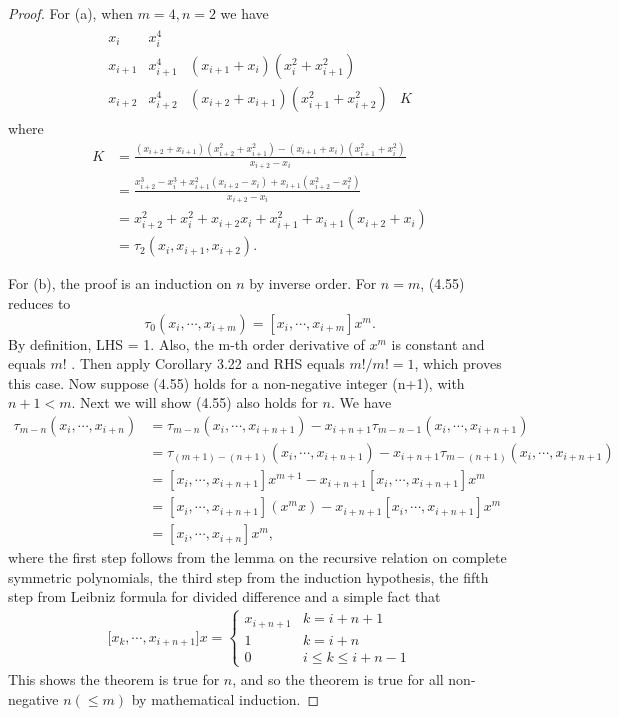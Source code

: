 \documentclass{article}
\newcommand{\RNum}[1]{\uppercase\expandafter{\romannumeral #1\relax}}
\begin{document}
\RNum{8}
\begin{proof}
  For (a), when $m=4,n=2$ we have 
\begin{align*}
  \begin{array}{c|ccc}x_i&x_i^4&&\\x_{i+1}&x_{i+1}^4&(x_{i+1}+x_i)(x_i^2+x_{i+1}^2)&\\x_{i+2}&x_{i+2}^4&(x_{i+2}+x_{i+1})(x_{i+1}^2+x_{i+2}^2)&K\end{array}
\end{align*}
where 
\begin{align*}
  K&=\frac{(x_{i+2}+x_{i+1})(x_{i+2}^2+x_{i+1}^2)-(x_{i+1}+x_{i})(x_{i+1}^2+x_{i}^2)}{x_{i+2}-x_i}\\
  &=\frac{x_{i+2}^3-x_i^3+x_{i+1}^2(x_{i+2}-x_i)+x_{i+1}(x_{i+2}^2-x_i^2)}{x_{i+2}-x_i}\\
  &=x_{i+2}^2+x_i^2+x_{i+2}x_i+x_{i+1}^2+x_{i+1}(x_{i+2}+x_{i})\\
  &=\tau_2(x_i,x_{i+1},x_{i+2}). 
\end{align*}

For (b), the proof is an induction on $n$ by inverse order. 
For $n=m$, (4.55) reduces to 
\[
\tau_0(x_i,\cdots,x_{i+m})=[x_i,\cdots,x_{i+m}]x^m.  
\]
By definition, LHS = 1. Also, the m-th order derivative of 
$x^m$ is constant and equals $m!$ . Then apply Corollary 3.22 and RHS equals $m!/m!=1$, 
which proves this case. Now suppose (4.55) holds for a non-negative integer (n+1), 
with $n+1<m$. Next we will show (4.55) also holds for $n$. We have  
\begin{align*}
  \tau_{m-n}(x_i,\cdots,x_{i+n})&= \tau_{m-n}(x_i,\cdots,x_{i+n+1})-x_{i+n+1}\tau_{m-n-1}(x_i,\cdots,x_{i+n+1})\\
  &=\tau_{(m+1)-(n+1)}(x_i,\cdots,x_{i+n+1})-x_{i+n+1}\tau_{m-(n+1)}(x_i,\cdots,x_{i+n+1})\\
  &=[x_i,\cdots,x_{i+n+1}]x^{m+1}-x_{i+n+1}[x_i,\cdots,x_{i+n+1}]x^{m}\\
  &=[x_i,\cdots,x_{i+n+1}](x^{m}x)-x_{i+n+1}[x_i,\cdots,x_{i+n+1}]x^{m}\\
  &=[x_i,\cdots,x_{i+n}]x^{m},
\end{align*}
where the first step follows from the lemma on the recursive relation on complete symmetric 
polynomials, the third step from the induction hypothesis, the fifth step from Leibniz formula 
for divided difference and a simple fact that 
\begin{align*}
  \lbrack x_k,\cdots,x_{i+n+1}\rbrack x=\left\{\begin{array}{lc}x_{i+n+1}&k=i+n+1\\1&k=i+n\\0&i\leqslant k\leqslant i+n-1\end{array}\right.
\end{align*}
This shows the theorem is true for $n$, and so the theorem is true for all non-negative $n(\leq m)$ by mathematical induction.
\end{proof}
\end{document}
